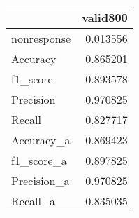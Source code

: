 
\begin{tabular}{lr}
\hline
             &    valid800 \\
\hline
 nonresponse & 0.013556 \\
 Accuracy    & 0.865201 \\
 f1_score    & 0.893578 \\
 Precision   & 0.970825 \\
 Recall      & 0.827717 \\
 Accuracy_a  & 0.869423 \\
 f1_score_a  & 0.897825 \\
 Precision_a & 0.970825 \\
 Recall_a    & 0.835035 \\
\hline
\end{tabular}